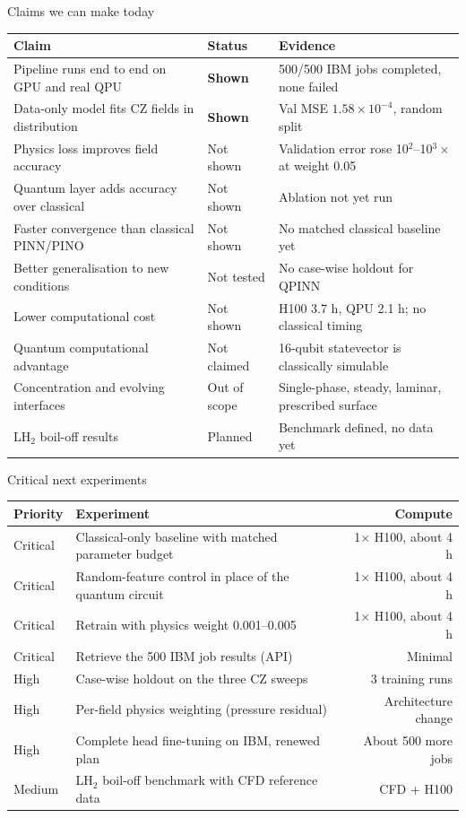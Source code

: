 \documentclass[aspectratio=169]{beamer}
\begin{document}
\begin{frame}{Claims we can make today}
\renewcommand{\arraystretch}{1.1}
\footnotesize
\begin{tabular}{p{} p{} p{}}
\toprule
Claim & Status & Evidence \\
\midrule
Pipeline runs end to end on GPU and real QPU & \textbf{Shown} & 500/500 IBM jobs completed, none failed \\
Data-only model fits CZ fields in distribution & \textbf{Shown} & Val MSE $1.58\times10^{-4}$, random split \\
Physics loss improves field accuracy & Not shown & Validation error rose 10$^{2}$--10$^{3}\times$ at weight 0.05 \\
Quantum layer adds accuracy over classical & Not shown & Ablation not yet run \\
Faster convergence than classical PINN/PINO & Not shown & No matched classical baseline yet \\
Better generalisation to new conditions & Not tested & No case-wise holdout for QPINN \\
Lower computational cost & Not shown & H100 3.7 h, QPU 2.1 h; no classical timing \\
Quantum computational advantage & Not claimed & 16-qubit statevector is classically simulable \\
Concentration and evolving interfaces & Out of scope & Single-phase, steady, laminar, prescribed surface \\
LH$_2$ boil-off results & Planned & Benchmark defined, no data yet \\
\bottomrule
\end{tabular}
\end{frame}

\begin{frame}{Critical next experiments}
\renewcommand{\arraystretch}{1.1}
\small
\begin{tabular}{llr}
\toprule
Priority & Experiment & Compute \\
\midrule
Critical & Classical-only baseline with matched parameter budget & 1$\times$ H100, about 4 h \\
Critical & Random-feature control in place of the quantum circuit & 1$\times$ H100, about 4 h \\
Critical & Retrain with physics weight 0.001--0.005 & 1$\times$ H100, about 4 h \\
Critical & Retrieve the 500 IBM job results (API) & Minimal \\
High & Case-wise holdout on the three CZ sweeps & 3 training runs \\
High & Per-field physics weighting (pressure residual) & Architecture change \\
High & Complete head fine-tuning on IBM, renewed plan & About 500 more jobs \\
Medium & LH$_2$ boil-off benchmark with CFD reference data & CFD + H100 \\
\bottomrule
\end{tabular}
\end{frame}
\end{document}

